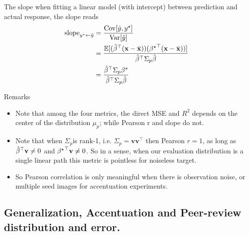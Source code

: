 %
\begin{lem}
\label{lem:linear_slope}The slope when fitting a linear model (with
intercept) between prediction and actual response, the slope reads
\begin{align*}
\mathrm{slope}_{y^{\star}\gets\hat{y}} & =\frac{\mathrm{Cov}[\hat{y},y^{\star}]}{\mathrm{Var}[\hat{y}]}\\
 & =\frac{\mathbb{E}[({\hat{\beta}}^{\top}(\mathbf{x}-\bar{\mathbf{x}}))({{\beta^{\star}}}^{\top}(\mathbf{x}-\bar{\mathbf{x}}))]}{{\hat{\beta}}^{\top}\Sigma_{p}\hat{\beta}}\\
 & =\frac{{\hat{\beta}}^{\top}\Sigma_{p}{\beta^{\star}}}{{\hat{\beta}}^{\top}\Sigma_{p}\hat{\beta}}
\end{align*}
\end{lem}
Remarks
\begin{itemize}
\item Note that among the four metrics, the direct MSE and $R^{2}$ depends
on the center of the distribution $\mu_{p}$; while Pearson r and
slope do not.
\item Note that when $\Sigma_{p}$is rank-1, i.e. $\Sigma_{p}=\mathbf{v}\mathbf{v}^{\top}$
then Pearson $r=1$, as long as ${\hat{\beta}}^{\top}\mathbf{v}\neq0$
and ${{\beta^{\star}}}^{\top}\mathbf{v}\neq0$. So in a sense, when
our evaluation distribution is a single linear path this metric is
pointless for noiseless target.
\item So Pearson correlation is only meaningful when there is observation
noise, or multiple seed images for accentuation experiments.
\end{itemize}

\subsection{Generalization, Accentuation and Peer-review distribution and error. }
\label{sec:app-evaluation-distributions}

